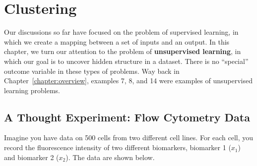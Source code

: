 \chapter{Clustering \label{chapter:clustering}}

Our discussions so far have focused on the problem of supervised learning, in which we create a mapping between a set of inputs and an output. In this chapter, we turn our attention to the problem of \textbf{unsupervised learning}, in which our goal is to uncover hidden structure in a dataset. There is no ``special'' outcome variable in these types of problems. Way back in Chapter~\ref{chapter:overview}, examples 7, 8, and 14 were examples of unsupervised learning problems.


\section{A Thought Experiment: Flow Cytometry Data}

Imagine you have data on 500 cells from two different cell lines. For each cell, you record the fluorescence intensity of two different biomarkers, biomarker 1 ($x_1$) and biomarker 2 ($x_2$). The data are shown below. 

